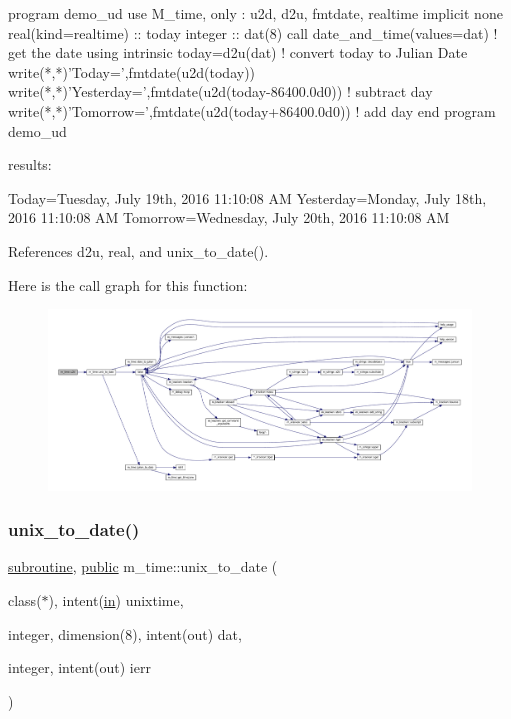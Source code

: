 \begin{DoxyVerb}
\begin{DoxyVerb}
 program demo_ud
 use M_time, only : u2d, d2u, fmtdate, realtime
 implicit none
 real(kind=realtime) :: today
 integer :: dat(8)
    call date_and_time(values=dat) ! get the date using intrinsic
    today=d2u(dat)                 ! convert today to Julian Date
    write(*,*)'Today=',fmtdate(u2d(today))
    write(*,*)'Yesterday=',fmtdate(u2d(today-86400.0d0)) ! subtract day
    write(*,*)'Tomorrow=',fmtdate(u2d(today+86400.0d0))  ! add day
 end program demo_ud

results:

 Today=Tuesday, July 19th, 2016 11:10:08 AM
 Yesterday=Monday, July 18th, 2016 11:10:08 AM
 Tomorrow=Wednesday, July 20th, 2016 11:10:08 AM \end{DoxyVerb}
 

References d2u, real, and unix\+\_\+to\+\_\+date().

Here is the call graph for this function\+:
\nopagebreak
\begin{figure}[H]
\begin{center}
\leavevmode
\includegraphics[width=350pt]{namespacem__time_a083bc231f8ba1879d7f86ab424e77d6c_cgraph}
\end{center}
\end{figure}
\mbox{\label{namespacem__time_acc62ada23f8fa2fe67b428702fbcbf1c}} 
\subsubsection{\texorpdfstring{unix\+\_\+to\+\_\+date()}{unix\_to\_date()}}
{\footnotesize\ttfamily \hyperlink{M__stopwatch_83_8txt_acfbcff50169d691ff02d4a123ed70482}{subroutine}, \hyperlink{M__stopwatch_83_8txt_a2f74811300c361e53b430611a7d1769f}{public} m\+\_\+time\+::unix\+\_\+to\+\_\+date (\begin{DoxyParamCaption}\item[{class($\ast$), intent(\hyperlink{M__journal_83_8txt_afce72651d1eed785a2132bee863b2f38}{in})}]{unixtime,  }\item[{integer, dimension(8), intent(out)}]{dat,  }\item[{integer, intent(out)}]{ierr }\end{DoxyParamCaption})}




\end{DoxyVerb}
